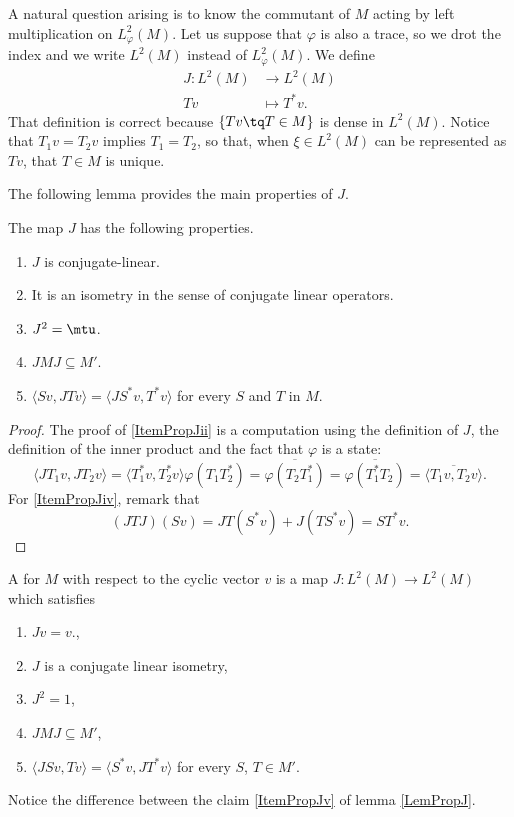 A natural question arising is to know the commutant of $M$ acting by left multiplication on $ L_{\varphi}^2(M)$. Let us suppose that $\varphi$ is also a trace, so we drot the index and we write $ L^2(M)$ instead of $ L_{\varphi}^2(M)$. We define
\begin{equation}
\begin{aligned}
 J\colon  L^2(M)&\to  L^2(M) \\ 
   Tv&\mapsto T^*v. 
\end{aligned}
\end{equation}
That definition is correct because $\{ Tv\tq T\in M \}$ is dense in $L^2(M)$. Notice that $T_1v=T_2v$ implies $T_1=T_2$, so that, when $\xi\in L^2(M)$ can be represented as $Tv$, that $T\in M$ is unique. 

The following lemma provides the main properties of $J$.
\begin{lemma}			\label{LemPropJ}
	The map $J$ has the following properties.
	\begin{enumerate}
		\item $J$ is conjugate-linear.
		\item\label{ItemPropJii} It is an isometry in the sense of conjugate linear operators.
		\item $J^2=\mtu$.
		\item\label{ItemPropJiv} $JMJ\subseteq M'$.
		\item\label{ItemPropJv}  $\langle Sv, JTv\rangle = \langle JS^*v, T^*v\rangle  $ for every $S$ and $T$ in $M$.
	\end{enumerate}
\end{lemma}

\begin{proof}
	The proof of \ref{ItemPropJii} is a computation using the definition of $J$, the definition of the inner product and the fact that $\varphi$ is a state:
	\begin{equation}
		\langle JT_1v, JT_2v\rangle =\langle T_1^*v, T_2^*v\rangle\varphi(T_1T^*_2)=\overline{ \varphi(T_2T_1^*) }=\overline{ \varphi(T_1^*T_2) }=\overline{ \langle T_1v, T_2v\rangle  }.
	\end{equation}
	For \ref{ItemPropJiv}, remark that
	\begin{equation}
		(JTJ)(Sv)=JT(S^*v)+J(TS^*v)=ST^*v.
	\end{equation}
\end{proof}

\begin{definition}
	A  for $M$ with respect to the cyclic vector $v$ is a map $J\colon L^2(M)\to L^2(M)$ which satisfies 
	\begin{enumerate}
		\item $Jv=v$.,
		\item $J$ is a conjugate linear isometry,
		\item $J^2=1$,
		\item $JMJ\subseteq M'$,
		\item $\langle JSv, Tv\rangle =\langle S^*v, JT^*v\rangle $ for every $S$, $T\in M'$.
	\end{enumerate}
	Notice the difference between the claim \ref{ItemPropJv} of lemma \ref{LemPropJ}.
\end{definition}

